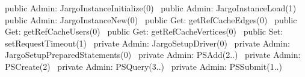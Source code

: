 public \LA{}Admin: JargoInstanceInitialize(0)~{\nwtagstyle{}}\RA{}
public \LA{}Admin: JargoInstanceLoad(1)~{\nwtagstyle{}}\RA{}
public \LA{}Admin: JargoInstanceNew(0)~{\nwtagstyle{}}\RA{}
public \LA{}Get: getRefCacheEdges(0)~{\nwtagstyle{}}\RA{}
public \LA{}Get: getRefCacheUsers(0)~{\nwtagstyle{}}\RA{}
public \LA{}Get: getRefCacheVertices(0)~{\nwtagstyle{}}\RA{}
public \LA{}Set: setRequestTimeout(1)~{\nwtagstyle{}}\RA{}
private \LA{}Admin: JargoSetupDriver(0)~{\nwtagstyle{}}\RA{}
private \LA{}Admin: JargoSetupPreparedStatements(0)~{\nwtagstyle{}}\RA{}
private \LA{}Admin: PSAdd(2..)~{\nwtagstyle{}}\RA{}
private \LA{}Admin: PSCreate(2)~{\nwtagstyle{}}\RA{}
private \LA{}Admin: PSQuery(3..)~{\nwtagstyle{}}\RA{}
private \LA{}Admin: PSSubmit(1..)~{\nwtagstyle{}}\RA{}
\nwendcode{}\nwdocspar

